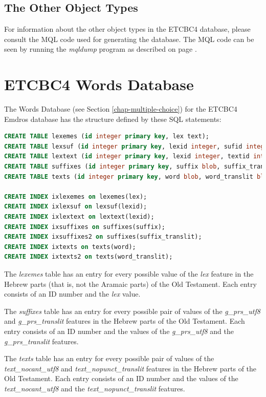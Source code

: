 \documentclass[11pt,oneside,a4paper]{memoir}
\begin{document}
\section{The Other Object Types}

For information about the other object types in the ETCBC4 database, please consult the MQL code
used for generating the database. The MQL code can be seen by running the \emph{mqldump} program as
described on page \pageref{list-mqldump}.

\chapter{ETCBC4 Words Database}\label{app-worddb}

The Words Database (see Section \ref{chap-multiple-choice}) for the ETCBC4 Emdros database has the
structure defined by these SQL statements:

\begin{lstlisting}[language=SQL]
CREATE TABLE lexemes (id integer primary key, lex text);
CREATE TABLE lexsuf (id integer primary key, lexid integer, sufid integer);
CREATE TABLE lextext (id integer primary key, lexid integer, textid integer);
CREATE TABLE suffixes (id integer primary key, suffix blob, suffix_translit blot);
CREATE TABLE texts (id integer primary key, word blob, word_translit blob);

CREATE INDEX ixlexemes on lexemes(lex);
CREATE INDEX ixlexsuf on lexsuf(lexid);
CREATE INDEX ixlextext on lextext(lexid);
CREATE INDEX ixsuffixes on suffixes(suffix);
CREATE INDEX ixsuffixes2 on suffixes(suffix_translit);
CREATE INDEX ixtexts on texts(word);
CREATE INDEX ixtexts2 on texts(word_translit);
\end{lstlisting}

The \emph{lexemes} table has an entry for every possible value of the \emph{lex} feature in the
Hebrew parts (that is, not the Aramaic parts) of the Old Testament. Each entry consists of an ID
number and the \emph{lex} value.

The \emph{suffixes} table has an entry for every possible pair of values of the \emph{g\_prs\_utf8}
and \emph{g\_prs\_translit} features in the Hebrew parts of the Old Testament. Each entry consists
of an ID number and the values of the \emph{g\_prs\_utf8} and the \emph{g\_prs\_translit} features.

The \emph{texts} table has an entry for every possible pair of values of the
\emph{text\_nocant\_utf8} and \emph{text\_nopunct\_translit} features
in the Hebrew parts of the Old Testament. Each entry consists of an ID number and the values of the
\emph{text\_nocant\_utf8} and the \emph{text\_nopunct\_translit} features.
\end{document}
